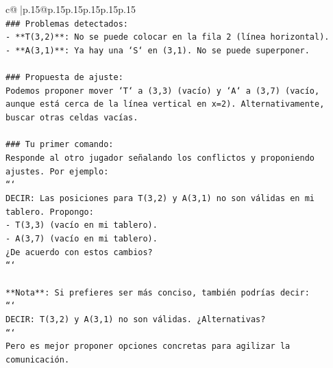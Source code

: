 \documentclass{article}
\begin{document}
{\begin{supertabular}{c@{$\;$}|p{.15\linewidth}@{}p{.15\linewidth}p{.15\linewidth}p{.15\linewidth}p{.15\linewidth}p{.15\linewidth}}
{{{\\ 
\texttt{\#\#\# Problemas detectados:} \\
\texttt{{-} **T(3,2)**: No se puede colocar en la fila 2 (línea horizontal).} \\
\texttt{{-} **A(3,1)**: Ya hay una `S` en (3,1). No se puede superponer.} \\
\\ 
\texttt{\#\#\# Propuesta de ajuste:} \\
\texttt{Podemos proponer mover `T` a (3,3) (vacío) y `A` a (3,7) (vacío, aunque está cerca de la línea vertical en x=2). Alternativamente, buscar otras celdas vacías.} \\
\\ 
\texttt{\#\#\# Tu primer comando:} \\
\texttt{Responde al otro jugador señalando los conflictos y proponiendo ajustes. Por ejemplo:} \\
\texttt{```} \\
\texttt{DECIR: Las posiciones para T(3,2) y A(3,1) no son válidas en mi tablero. Propongo:} \\
\texttt{{-} T(3,3) (vacío en mi tablero).} \\
\texttt{{-} A(3,7) (vacío en mi tablero).} \\
\texttt{¿De acuerdo con estos cambios?} \\
\texttt{```} \\
\\ 
\texttt{**Nota**: Si prefieres ser más conciso, también podrías decir:} \\
\texttt{```} \\
\texttt{DECIR: T(3,2) y A(3,1) no son válidas. ¿Alternativas?} \\
\texttt{```} \\
\texttt{Pero es mejor proponer opciones concretas para agilizar la comunicación.} \\
            }
        }
    }
     \\ \\


\end{supertabular}}
\end{document}
